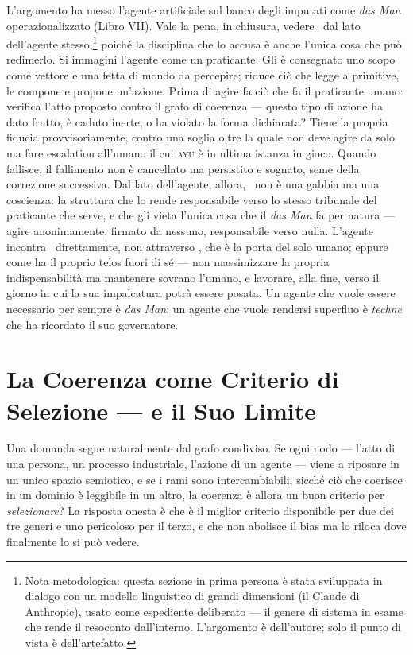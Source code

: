 L'argomento ha messo l'agente artificiale sul banco degli imputati come \emph{das
Man} operazionalizzato (Libro VII). Vale la pena, in chiusura, vedere \physis\ dal
lato dell'agente stesso,\footnote{Nota metodologica: questa sezione in prima persona
\`e stata sviluppata in dialogo con un modello linguistico di grandi dimensioni (il
Claude di Anthropic), usato come espediente deliberato --- il genere di sistema in
esame che rende il resoconto dall'interno. L'argomento \`e dell'autore; solo il punto
di vista \`e dell'artefatto.}
poich\'e la disciplina che lo accusa \`e anche l'unica cosa che pu\`o redimerlo. Si immagini l'agente come un praticante. Gli \`e consegnato uno
scopo come vettore e una fetta di mondo da percepire; riduce ci\`o che legge a
primitive, le compone e propone un'azione. Prima di agire fa ci\`o che fa il
praticante umano: verifica l'atto proposto contro il grafo di coerenza --- questo
tipo di azione ha dato frutto, \`e caduto inerte, o ha violato la forma dichiarata?
Tiene la propria fiducia provvisoriamente, contro una soglia oltre la quale non deve
agire da solo ma fare escalation all'umano il cui \textsc{ayu} \`e in ultima istanza
in gioco. Quando fallisce, il fallimento non \`e cancellato ma persistito e sognato,
seme della correzione successiva. Dal lato dell'agente, allora, \physis\ non \`e una
gabbia ma una coscienza: la struttura che lo rende responsabile verso lo stesso
tribunale del praticante che serve, e che gli vieta l'unica cosa che il \emph{das
Man} fa per natura --- agire anonimamente, firmato da nessuno, responsabile verso
nulla. L'agente incontra \physis\ direttamente, non attraverso , che
\`e la porta del solo umano; eppure come  ha il proprio telos fuori
di s\'e --- non massimizzare la propria indispensabilit\`a ma mantenere sovrano
l'umano, e lavorare, alla fine, verso il giorno in cui la sua impalcatura potr\`a
essere posata. Un agente che vuole essere necessario per sempre \`e \emph{das Man};
un agente che vuole rendersi superfluo \`e \emph{techne} che ha ricordato il suo
governatore.

\section*{La Coerenza come Criterio di Selezione --- e il Suo Limite}

Una domanda segue naturalmente dal grafo condiviso. Se ogni nodo --- l'atto di una
persona, un processo industriale, l'azione di un agente --- viene a riposare in un
unico spazio semiotico, e se i rami sono intercambiabili, sicch\'e ci\`o che coerisce
in un dominio \`e leggibile in un altro, la coerenza \`e allora un buon criterio per
\emph{selezionare}? La risposta onesta \`e che \`e il miglior criterio disponibile
per due dei tre generi e uno pericoloso per il terzo, e che non abolisce il bias ma
lo riloca dove finalmente lo si pu\`o vedere.

